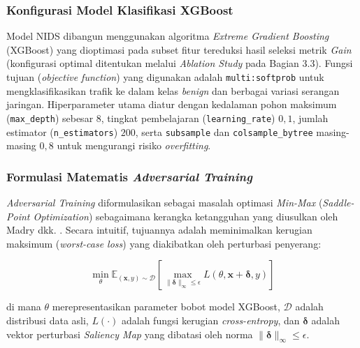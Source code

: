 \documentclass[11pt, a4paper]{article}
\begin{document}
\subsubsection{Konfigurasi Model Klasifikasi XGBoost}
Model NIDS dibangun menggunakan algoritma \textit{Extreme Gradient Boosting} (XGBoost) yang dioptimasi pada subset fitur tereduksi hasil seleksi metrik \textit{Gain} (konfigurasi optimal ditentukan melalui \textit{Ablation Study} pada Bagian 3.3). Fungsi tujuan (\textit{objective function}) yang digunakan adalah \texttt{multi:softprob} untuk mengklasifikasikan trafik ke dalam kelas \textit{benign} dan berbagai variasi serangan jaringan. Hiperparameter utama diatur dengan kedalaman pohon maksimum (\texttt{max\_depth}) sebesar $8$, tingkat pembelajaran (\texttt{learning\_rate}) $0{,}1$, jumlah estimator (\texttt{n\_estimators}) $200$, serta \texttt{subsample} dan \texttt{colsample\_bytree} masing-masing $0{,}8$ untuk mengurangi risiko \textit{overfitting}.

\subsubsection{Formulasi Matematis \textit{Adversarial Training}}
\textit{Adversarial Training} diformulasikan sebagai masalah optimasi \textit{Min-Max} (\textit{Saddle-Point Optimization}) sebagaimana kerangka ketangguhan yang diusulkan oleh Madry dkk. \cite{ref_madry}. Secara intuitif, tujuannya adalah meminimalkan kerugian maksimum (\textit{worst-case loss}) yang diakibatkan oleh perturbasi penyerang:

\begin{equation}
\min_{\theta} \mathbb{E}_{(\mathbf{x}, y) \sim \mathcal{D}} \left[ \max_{\|\boldsymbol{\delta}\|_\infty \le \epsilon} L(\theta, \mathbf{x} + \boldsymbol{\delta}, y) \right]
\end{equation}

di mana $\theta$ merepresentasikan parameter bobot model XGBoost, $\mathcal{D}$ adalah distribusi data asli, $L(\cdot)$ adalah fungsi kerugian \textit{cross-entropy}, dan $\boldsymbol{\delta}$ adalah vektor perturbasi \textit{Saliency Map} yang dibatasi oleh norma $\|\boldsymbol{\delta}\|_\infty \le \epsilon$.
\end{document}
